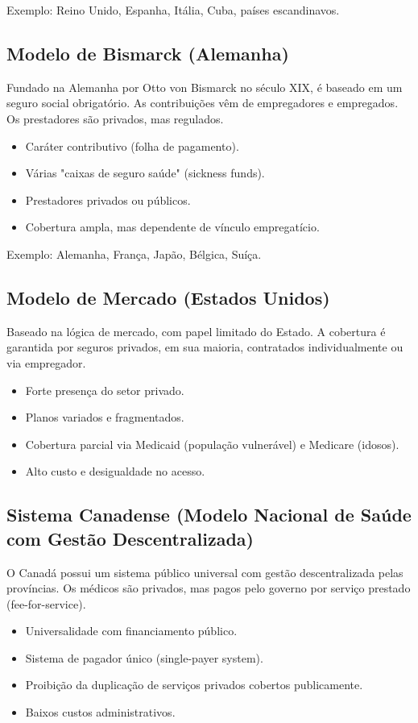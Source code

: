 \documentclass[a4paper,12pt]{article}
\begin{document}
Exemplo: Reino Unido, Espanha, Itália, Cuba, países escandinavos.
\subsection{Modelo de Bismarck (Alemanha)}
\label{sec:orgc2e41f0}
Fundado na Alemanha por Otto von Bismarck no século XIX, é baseado em um seguro social obrigatório. As contribuições vêm de empregadores e empregados. Os prestadores são privados, mas regulados.

\begin{itemize}
\item Caráter contributivo (folha de pagamento).
\item Várias "caixas de seguro saúde" (sickness funds).
\item Prestadores privados ou públicos.
\item Cobertura ampla, mas dependente de vínculo empregatício.
\end{itemize}

Exemplo: Alemanha, França, Japão, Bélgica, Suíça.
\subsection{Modelo de Mercado (Estados Unidos)}
\label{sec:orgd128977}
Baseado na lógica de mercado, com papel limitado do Estado. A cobertura é garantida por seguros privados, em sua maioria, contratados individualmente ou via empregador.

\begin{itemize}
\item Forte presença do setor privado.
\item Planos variados e fragmentados.
\item Cobertura parcial via Medicaid (população vulnerável) e Medicare (idosos).
\item Alto custo e desigualdade no acesso.
\end{itemize}
\subsection{Sistema Canadense (Modelo Nacional de Saúde com Gestão Descentralizada)}
\label{sec:org5065bcf}
O Canadá possui um sistema público universal com gestão descentralizada pelas províncias. Os médicos são privados, mas pagos pelo governo por serviço prestado (fee-for-service).

\begin{itemize}
\item Universalidade com financiamento público.
\item Sistema de pagador único (single-payer system).
\item Proibição da duplicação de serviços privados cobertos publicamente.
\item Baixos custos administrativos.
\end{itemize}
\end{document}

